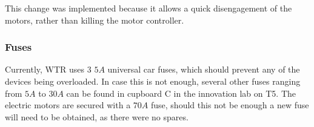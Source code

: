 This change was implemented because it allows a quick disengagement of the motors, rather than killing the motor controller.


\subsubsection{Fuses}
Currently, WTR uses 3 $5A$ universal car fuses, which should prevent any of the devices being overloaded.
In case this is not enough, several other fuses ranging from $5A$ to $30A$ can be found in cupboard C in the innovation lab on T5.
The electric motors are secured with a $70A$ fuse, should this not be enough a new fuse will need to be obtained, as there were no spares.

\newpage
